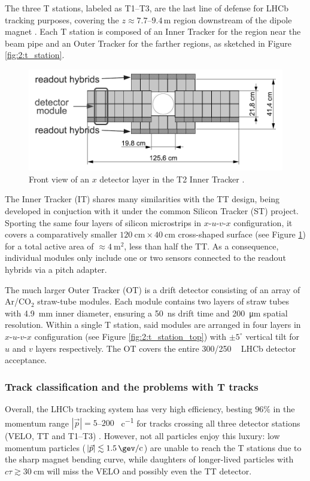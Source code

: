 The three T stations, labeled as T1--T3, are the last line of defense for LHCb tracking purposes, covering the $z \approx 7.7$--$9.4\,\si{\meter}$ region downstream of the dipole magnet \cite{Barbosa-Marinho:582793}.
Each T station is composed of an Inner Tracker for the region near the beam pipe and an Outer Tracker for the farther regions, as sketched in Figure \ref{fig:2:t_station}.

\begin{figure}[t]
	\centering
	\includegraphics[width=.6\textwidth]{graphics/02-lhcb/it_layout.png}
	\caption[Front view of an Inner Tracker $x$ layer.]{Front view of an $x$ detector layer in the T2 Inner Tracker \cite{Alves:1129809}.}
	\label{fig:2:IT}
\end{figure}

The Inner Tracker (IT) \cite{Barbosa-Marinho:582793} shares many similarities with the TT design, being developed in conjuction with it under the common Silicon Tracker (ST) project.
Sporting the same four layers of silicon microstrips in $x$-$u$-$v$-$x$ configuration, it covers a comparatively smaller $\SI{120}{\centi\meter} \times \SI{40}{\centi\meter}$ cross-shaped surface (see Figure \ref{fig:2:IT}) for a total active area of $\approx \SI{4}{\meter\squared}$, less than half the TT.
As a consequence, individual modules only include one or two sensors  connected to the readout hybrids via a pitch adapter.

The much larger Outer Tracker (OT) \cite{Barbosa-Marinho:519146} is a drift detector consisting of an array of Ar/CO$_2$ straw-tube modules.
Each module contains two layers of straw tubes with \SI{4.9}{\milli\meter} inner diameter, ensuring a \SI{50}{\nano\second} drift time and \SI{200}{\micro\meter} spatial resolution.
Within a single T station, said modules are arranged in four layers in $x$-$u$-$v$-$x$ configuration (see Figure \ref{fig:2:t_station_top}) with $\pm 5^\circ$ vertical tilt for $u$ and $v$ layers respectively.
The OT covers the entire 300/250 \si{\milli\rad} LHCb detector acceptance.

\subsubsection{Track classification and the problems with T tracks}
Overall, the LHCb tracking system has very high efficiency, besting $96\%$ in the momentum range $|\vec{p}|=5$--$200$ \si{\gev\per c} for tracks crossing all three detector stations (VELO, TT and T1--T3) \cite{HistoryLHCb}. 
However, not all particles enjoy this luxury:
low momentum particles ($|\vec{p}| \lesssim \SI{1.5}{\gev\per c}$) are unable to reach the T stations due to the sharp magnet bending curve, while daughters of longer-lived particles with $c\tau \gtrsim \SI{30}{\centi\meter}$ will miss the VELO and possibly even the TT detector.


